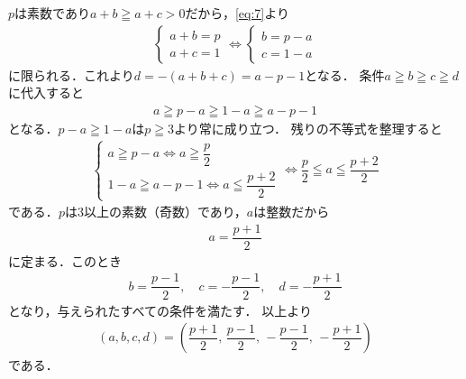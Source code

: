 \documentclass[../../main.tex]{subfiles}
\begin{document}
$p$は素数であり$a+b \geqq a+c > 0$だから，\cref{eq:7}より
\begin{align}
  \begin{cases}
    a+b = p \\
    a+c = 1
  \end{cases}
  \iff
  \begin{cases}
    b = p-a \\
    c = 1-a
  \end{cases}
\end{align}
に限られる．これより$d = -(a+b+c) = a-p-1$となる．
条件$a \geqq b \geqq c \geqq d$に代入すると
\begin{align}
  a \geqq p-a \geqq 1-a \geqq a-p-1
\end{align}
となる．$p-a \geqq 1-a$は$p \geqq 3$より常に成り立つ．
残りの不等式を整理すると
\begin{align}
  \begin{cases}
    a \geqq p-a \iff a \geqq \dfrac{p}{2} \\
    1-a \geqq a-p-1 \iff a \leqq \dfrac{p+2}{2}
  \end{cases}
  \iff \dfrac{p}{2} \leqq a \leqq \dfrac{p+2}{2}
\end{align}
である．$p$は$3$以上の素数（奇数）であり，$a$は整数だから
\begin{align}
  a = \dfrac{p+1}{2}
\end{align}
に定まる．このとき
\begin{align}
  b = \dfrac{p-1}{2}, \quad c = -\dfrac{p-1}{2}, \quad d = -\dfrac{p+1}{2}
\end{align}
となり，与えられたすべての条件を満たす．
以上より
\begin{align}
  (a,b,c,d)=\left(\dfrac{p+1}{2},\,\dfrac{p-1}{2},\,-\dfrac{p-1}{2},\,-\dfrac{p+1}{2}\right)
\end{align}
である．
\end{document}
